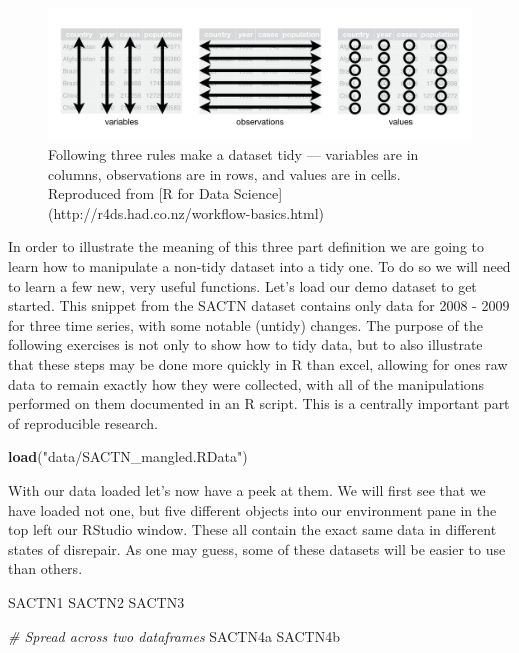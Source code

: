 \documentclass[]{book}
\newenvironment{Shaded}{\begin{snugshade}}{\end{snugshade}}
\newcommand{\KeywordTok}[1]{\textcolor[rgb]{0.13,0.29,0.53}{\textbf{#1}}}
\newcommand{\StringTok}[1]{\textcolor[rgb]{0.31,0.60,0.02}{#1}}
\newcommand{\CommentTok}[1]{\textcolor[rgb]{0.56,0.35,0.01}{\textit{#1}}}
\newcommand{\NormalTok}[1]{#1}
\theoremstyle{definition}
\theoremstyle{definition}
\theoremstyle{definition}
\theoremstyle{remark}
\begin{document}
\begin{figure}

{\centering \includegraphics[width=1\linewidth]{figures/tidy-1} 

}

\caption{Following three rules make a dataset tidy --- variables are in columns, observations are in rows, and values are in cells. Reproduced from [R for Data Science](http://r4ds.had.co.nz/workflow-basics.html)}\label{fig:tidy-structure}
\end{figure}

In order to illustrate the meaning of this three part definition we are
going to learn how to manipulate a non-tidy dataset into a tidy one. To
do so we will need to learn a few new, very useful functions. Let's load
our demo dataset to get started. This snippet from the SACTN dataset
contains only data for 2008 - 2009 for three time series, with some
notable (untidy) changes. The purpose of the following exercises is not
only to show how to tidy data, but to also illustrate that these steps
may be done more quickly in R than excel, allowing for ones raw data to
remain exactly how they were collected, with all of the manipulations
performed on them documented in an R script. This is a centrally
important part of reproducible research.

\begin{Shaded}
\begin{Highlighting}[]
\KeywordTok{load}\NormalTok{(}\StringTok{"data/SACTN_mangled.RData"}\NormalTok{)}
\end{Highlighting}
\end{Shaded}

With our data loaded let's now have a peek at them. We will first see
that we have loaded not one, but five different objects into our
environment pane in the top left our RStudio window. These all contain
the exact same data in different states of disrepair. As one may guess,
some of these datasets will be easier to use than others.

\begin{Shaded}
\begin{Highlighting}[]
\NormalTok{SACTN1}
\NormalTok{SACTN2}
\NormalTok{SACTN3}

\CommentTok{# Spread across two dataframes}
\NormalTok{SACTN4a}
\NormalTok{SACTN4b}
\end{Highlighting}
\end{Shaded}
\end{document}
